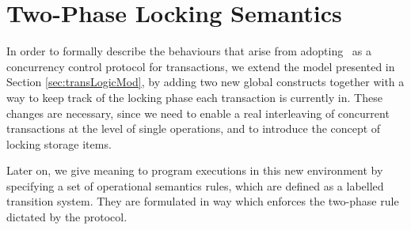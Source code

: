 \chapter{Two-Phase Locking Semantics}

\label{sec:2plSem}

In order to formally describe the behaviours that arise from adopting \tpl\ as a concurrency control protocol for transactions, we extend the model presented in Section \ref{sec:transLogicMod}, by adding two new global constructs together with a way to keep track of the locking phase each transaction is currently in. These changes are necessary, since we need to enable a real interleaving of concurrent transactions at the level of single operations, and to introduce the concept of locking storage items.

Later on, we give meaning to program executions in this new environment by specifying a set of operational semantics rules, which are defined as a labelled transition system. They are formulated in way which enforces the two-phase rule dictated by the protocol.



